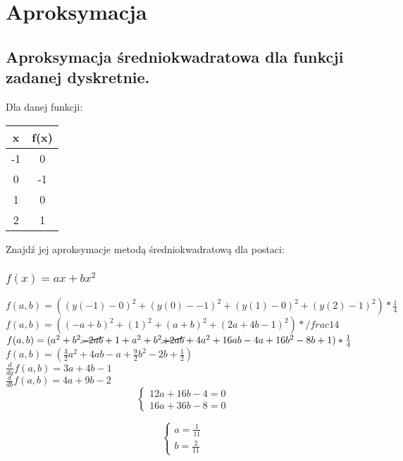 \documentclass{article}
\begin{document}
\section{Aproksymacja}
\subsection{Aproksymacja średniokwadratowa dla funkcji zadanej dyskretnie.}
Dla danej funkcji:
\begin{table}[H]
\begin{tabular}{|c|c|}
\hline
x  & f(x) \\ \hline
-1 & 0    \\ \hline
0  & -1   \\ \hline
1  & 0    \\ \hline
2  & 1    \\ \hline
\end{tabular}%

\end{table}
Znajdź jej aproksymacje metodą średniokwadratową dla postaci:\\
\subsubsection{$f(x)=ax+bx^2$}
$f(a,b) = ((y(-1)-0)^2 + (y(0)- -1)^2 + (y(1)-0)^2 + (y(2)-1)^2)*\frac{1}{4}$\\
$f(a,b) = ((-a+b)^2 + (1)^2 + (a+b)^2 + (2a+4b-1)^2)*/frac{1}{4}$\\
$f(a,b) = (a^2+b^2\cancel{-2ab} + 1 + a^2+b^2\cancel{+2ab} + 4a^2+16ab-4a+16b^2-8b+1)*\frac{1}{4}$\\
$f(a,b) = (\frac{3}{2}a^2+4ab-a+\frac{9}{2}b^2-2b+\frac{1}{2})$\\
$\frac{d}{da}f(a,b)=3a+4b-1$\\
$\frac{d}{db}f(a,b)=4a+9b-2$\\

\begin{equation*}\begin{cases}
    12a+16b-4=0 \\
    16a+36b-8=0
\end{cases}\end{equation*}

\begin{equation*}\begin{cases}
    a=\frac{1}{11}\\
    b=\frac{2}{11}
\end{cases}\end{equation*}\\
\end{document}
